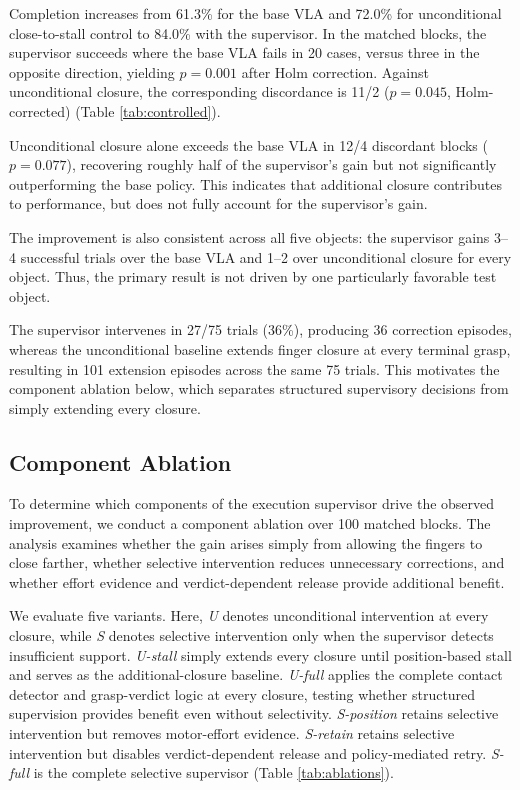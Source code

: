 \documentclass[letterpaper,10pt,conference]{ieeeconf}
\begin{document}
Completion increases from 61.3\% for the base VLA and 72.0\% for
unconditional close-to-stall control to 84.0\% with the supervisor. In the
matched blocks, the supervisor succeeds where the base VLA fails in 20 cases,
versus three in the opposite direction, yielding $p=0.001$ after Holm
correction. Against unconditional closure, the corresponding discordance is
11/2 ($p=0.045$, Holm-corrected) (Table \ref{tab:controlled}).

Unconditional closure alone exceeds the base VLA in 12/4 discordant blocks
($p=0.077$), recovering roughly half of the supervisor's gain but not
significantly outperforming the base policy. This indicates that additional
closure contributes to performance, but does not fully account for the
supervisor's gain.

The improvement is also consistent across all five objects: the supervisor
gains 3--4 successful trials over the base VLA and 1--2 over unconditional
closure for every object. Thus, the primary result is not driven by one
particularly favorable test object.

The supervisor intervenes in 27/75 trials (36\%), producing 36 correction
episodes, whereas the unconditional baseline extends finger closure at every
terminal grasp, resulting in 101 extension episodes across the same 75 trials.
This motivates the component ablation below, which separates structured
supervisory decisions from simply extending every closure.

\subsection{Component Ablation}
\label{sec:ablations}

To determine which components of the execution supervisor drive the observed
improvement, we conduct a component ablation over 100 matched blocks. The
analysis examines whether the gain arises simply from allowing the fingers to
close farther, whether selective intervention reduces unnecessary corrections,
and whether effort evidence and verdict-dependent release provide additional
benefit.

We evaluate five variants. Here, \emph{U} denotes unconditional intervention
at every closure, while \emph{S} denotes selective intervention only when the
supervisor detects insufficient support. \emph{U-stall} simply extends every
closure until position-based stall and serves as the additional-closure
baseline. \emph{U-full} applies the complete contact detector and grasp-verdict
logic at every closure, testing whether structured supervision provides benefit
even without selectivity. \emph{S-position} retains selective intervention but
removes motor-effort evidence. \emph{S-retain} retains selective intervention
but disables verdict-dependent release and policy-mediated retry.
\emph{S-full} is the complete selective supervisor
(Table \ref{tab:ablations}).
\end{document}
